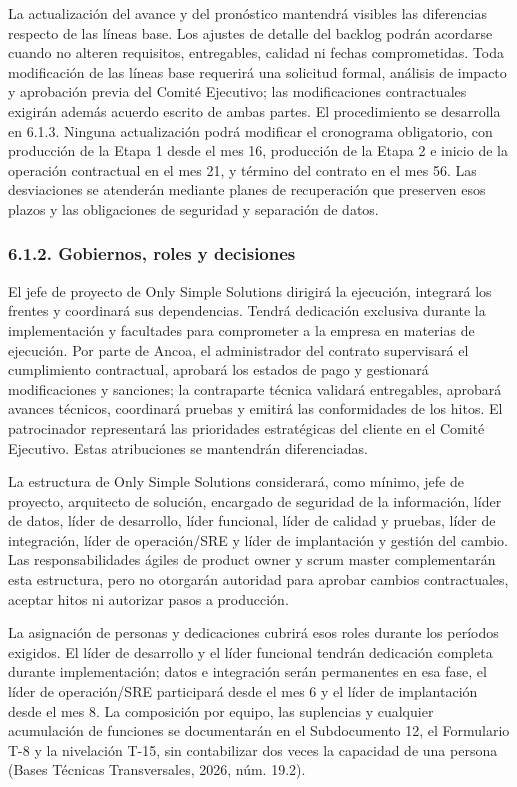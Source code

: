 \documentclass[11pt]{article}
\begin{document}
La actualización del avance y del pronóstico mantendrá visibles las
diferencias respecto de las líneas base. Los ajustes de detalle del
backlog podrán acordarse cuando no alteren requisitos, entregables,
calidad ni fechas comprometidas. Toda modificación de las líneas base
requerirá una solicitud formal, análisis de impacto y aprobación previa
del Comité Ejecutivo; las modificaciones contractuales exigirán además
acuerdo escrito de ambas partes. El procedimiento se desarrolla en
6.1.3. Ninguna actualización podrá modificar el cronograma obligatorio,
con producción de la Etapa 1 desde el mes 16, producción de la Etapa 2 e
inicio de la operación contractual en el mes 21, y término del contrato
en el mes 56. Las desviaciones se atenderán mediante planes de
recuperación que preserven esos plazos y las obligaciones de seguridad y
separación de datos.

\subsubsection{6.1.2. Gobiernos, roles y decisiones}\label{6-1-2-gobiernos-roles-y-decisiones}

El jefe de proyecto de Only Simple Solutions dirigirá la ejecución, integrará los frentes y coordinará sus dependencias. Tendrá dedicación exclusiva durante la implementación y facultades para comprometer a la empresa en materias de ejecución. Por parte de Ancoa, el administrador del contrato supervisará el cumplimiento contractual, aprobará los estados de pago y gestionará modificaciones y sanciones; la contraparte técnica validará entregables, aprobará avances técnicos, coordinará pruebas y emitirá las conformidades de los hitos. El patrocinador representará las prioridades estratégicas del cliente en el Comité Ejecutivo. Estas atribuciones se mantendrán diferenciadas.

La estructura de Only Simple Solutions considerará, como mínimo, jefe de
proyecto, arquitecto de solución, encargado de seguridad de la
información, líder de datos, líder de desarrollo, líder funcional, líder
de calidad y pruebas, líder de integración, líder de operación/SRE y
líder de implantación y gestión del cambio. Las responsabilidades ágiles
de product owner y scrum master complementarán esta estructura, pero no
otorgarán autoridad para aprobar cambios contractuales, aceptar hitos ni
autorizar pasos a producción.

La asignación de personas y dedicaciones cubrirá esos roles durante los
períodos exigidos. El líder de desarrollo y el líder funcional tendrán
dedicación completa durante implementación; datos e integración serán
permanentes en esa fase, el líder de operación/SRE participará desde el
mes 6 y el líder de implantación desde el mes 8. La composición por
equipo, las suplencias y cualquier acumulación de funciones se
documentarán en el Subdocumento 12, el Formulario T-8 y la nivelación
T-15, sin contabilizar dos veces la capacidad de una persona (Bases
Técnicas Transversales, 2026, núm. 19.2).
\end{document}
